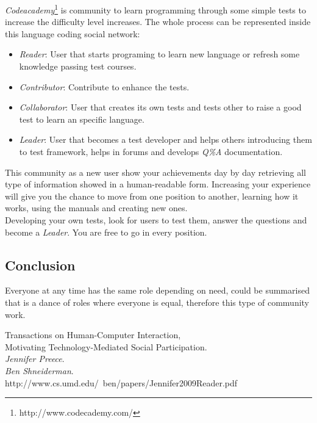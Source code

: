 \documentclass[11pt]{scrartcl}
\begin{document}
    \emph{Codeacademy}\footnote{http://www.codecademy.com/} is community to learn programming through some simple tests to increase the difficulty level increases. The whole process can be represented inside this language coding social network:

	\begin{itemize}
	
		\item \emph{Reader}: User that starts programing to learn new language or refresh some knowledge passing test courses.
		\item \emph{Contributor}: Contribute to enhance the tests.
		\item \emph{Collaborator}: User that creates its own tests and tests other to raise a good test to learn an specific language.
		\item \emph{Leader}: User that becomes a test developer and helps others introducing them to test framework, helps in forums and develops \emph{Q\%A} documentation.
	\end{itemize}

	This community as a new user show your achievements day by day retrieving all type of information showed in a human-readable form. Increasing your experience will give you the chance to move from one position to another, learning how it works, using the manuals and creating new ones.\\
	Developing your own tests, look for users to test them, answer the questions and become a \emph{Leader}. You are free to go in every position.
	
	\subsection{Conclusion}
	
	Everyone at any time has the same role depending on need, could be summarised that is a dance of roles where everyone is equal, therefore this type of community work.
	

\begin{thebibliography}{9}
	
		Transactions on Human-Computer Interaction,\\
		Motivating Technology-Mediated Social Participation.\\
		\emph{Jennifer Preece}.\\
		\emph{Ben Shneiderman}.\\
		http://www.cs.umd.edu/~ben/papers/Jennifer2009Reader.pdf
\end{thebibliography}
\end{document}
